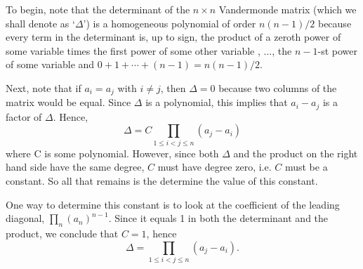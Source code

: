 \documentclass[12pt]{article}
\begin{document}
To begin, note that the determinant of the $n \times n$ Vandermonde
matrix (which we shall denote as `$\Delta$') is a homogeneous
polynomial of order $n(n-1)/2$ because every term in the determinant
is, up to sign, the product of a zeroth power of some variable times the first
power of some other variable , $\ldots$, the $n-1$-st power of some
variable and $0 + 1 + \cdots + (n-1) = n(n-1)/2$.

Next, note that if $a_i = a_j$ with $i \neq j$, then $\Delta = 0$
because two columns of the matrix would be equal.  Since $\Delta$ is a
polynomial, this implies that $a_i - a_j$ is a factor of $\Delta$.
Hence, 
 \[ \Delta = C \prod_{1 \leq i < j \leq n}(a_j - a_i) \]
where C is some polynomial.  However, since both $\Delta$ and the
product on the right hand side have the same degree, $C$ must have
degree zero, i.e. $C$ must be a constant.  So all that remains is the
determine the value of this constant.

One way to determine this constant is to look at the coefficient of
the leading diagonal, $\prod_n (a_n)^{n-1}$.  Since it equals 1 in both
the determinant and the product, we conclude that $C = 1$, hence
 \[ \Delta = \prod_{1 \leq i < j \leq n}(a_j - a_i). \]
\end{document}
